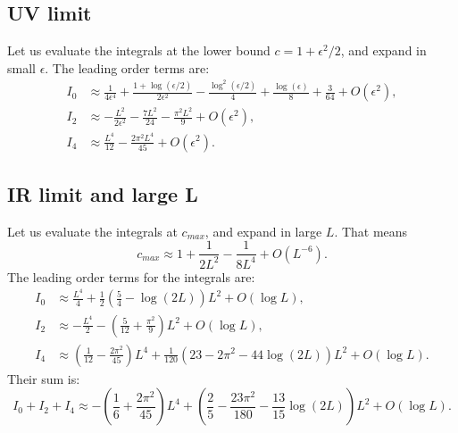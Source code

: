 \subsection{UV limit}\label{sec:UVlimit}
Let us evaluate the integrals at the lower bound $c = 1 + \epsilon^2/2$, and expand in small $\epsilon$. The leading order terms are:
\begin{align}
 I_0 &\approx \frac{1}{4 \epsilon ^4} +\frac{1+\log \left(\epsilon/2\right)}{2 \epsilon ^2}-\frac{ \log ^2\left(\epsilon/2\right)}{4}+\frac{\log (\epsilon )}{8} + \frac{3}{64} + O(\epsilon^2),\\
%     
I_2 & \approx -\frac{L^2}{2 \epsilon^2}-\frac{7 L^2}{24}-\frac{\pi ^2 L^2}{9} + O(\epsilon^2),\\
%    
 I_4 & \approx \frac{L^4}{12}-\frac{2 \pi ^2 L^4}{45} + O(\epsilon^2). 
\end{align}


\subsection{IR limit and large L} \label{sec:IRlimit}
Let us evaluate the integrals at $c_{max}$, and expand in large $L$. That means 
\begin{equation}
 c_{max} \approx 1 + \frac{1}{2 L^2} - \frac{1}{8 L^4} + O(L^{-6}).
\end{equation}
The leading order terms for the integrals are:
\begin{align}
 I_0 &\approx \frac{L^4}{4}+\frac{1}{2} \left(\frac{5}{4} - \log(2 L)\right) L^2 + O(\log L),\\
%     
I_2 & \approx -\frac{L^4}{2} -\left(\frac{5}{12}+\frac{\pi^2}{9}\right) L^2 + O(\log L),\\
%    
 I_4 & \approx \left(\frac{1}{12}-\frac{2 \pi ^2}{45}\right) L^4+ \frac{1}{120} \left(23 -2 \pi^2 - 44 \log(2 L) \right)L^2+ O(\log L). 
\end{align}
Their sum is:
\begin{equation}\label{eq:IatUV}
 I_0+I_2+I_4 \approx -\left(\frac{1}{6}+\frac{2 \pi ^2}{45}\right) L^4
             +\left(\frac{2}{5}-\frac{23 \pi ^2}{180}-\frac{ 13}{15} \log(2 L)\right)L^2 + O(\log L).
\end{equation}


